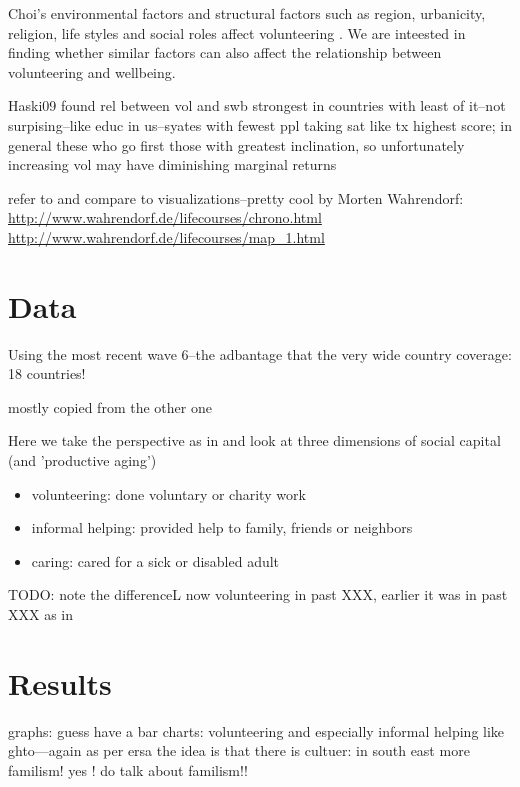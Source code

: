 \documentclass[10pt, letterpaper]{article}
\begin{document}
\begin{spacing}{1.4}
Choi's environmental factors and structural factors such as region, urbanicity,
religion, life styles and social roles affect volunteering \citep[][cited in]{hank09}.
 We are inteested in finding whether similar factors can also affect the
 relationship between volunteering and wellbeing. 

Haski09 found rel between vol and swb strongest in countries with least of
it--not surpising--like educ in us--syates with fewest ppl taking sat like tx
highest score; in general these who go first those with greatest inclination, so
unfortunately increasing vol may have diminishing marginal returns

refer to and compare to 
visualizations--pretty cool by Morten Wahrendorf:
\url{http://www.wahrendorf.de/lifecourses/chrono.html}
\url{http://www.wahrendorf.de/lifecourses/map_1.html}


\section{Data}

Using the most recent wave 6--the adbantage that the very wide country coverage:
18 countries!

mostly copied from the other one

Here we take the perspective as in \citet{hank10} and look at three dimensions
of social capital (and 'productive aging') %
\begin{itemize}
\item volunteering:  done voluntary or charity work
\item informal helping: provided help to family, friends or neighbors
\item caring: cared for a sick or disabled adult 
\end{itemize}

TODO: note the differenceL now volunteering in past XXX, earlier it was in past
XXX as in \citet{haski09}

\section{Results}

graphs: guess have a bar charts: volunteering and especially informal helping
like ghto---again as per ersa the idea is that there is cultuer: in south east
more familism! yes ! do talk about familism!!


\end{spacing}
\end{document}
